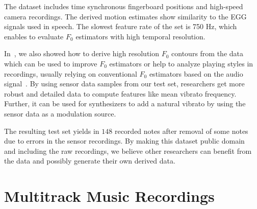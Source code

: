 \par
The dataset includes time synchronous fingerboard positions and high-speed camera recordings. 
The derived motion estimates show similarity to the EGG signals used in speech. 
The slowest feature rate of the set is 750 Hz, which enables to evaluate $F_0$ estimators with high temporal resolution. 
\par
In~\cite{stoeter15acm}, we also showed how to derive high resolution $F_0$ contours from the data which can be used to improve $F_0$ estimators or help to analyze playing styles in recordings, usually relying on conventional $F_0$ estimators based on the audio signal~\cite{mellody2000time}. 
By using sensor data samples from our test set, researchers get more robust and detailed data to compute features like mean vibrato frequency. 
Further, it can be used for synthesizers to add a natural vibrato by using the sensor data as a modulation source.
\par
The resulting test set yields in $148$ recorded notes after removal of some notes due to errors in the sensor recordings.
By making this dataset public domain~\cite{oss_muserc} and including the raw recordings, we believe other researchers can benefit from the data and possibly generate their own derived data.

\section{Multitrack Music Recordings}%
\label{sec:multitrack}

